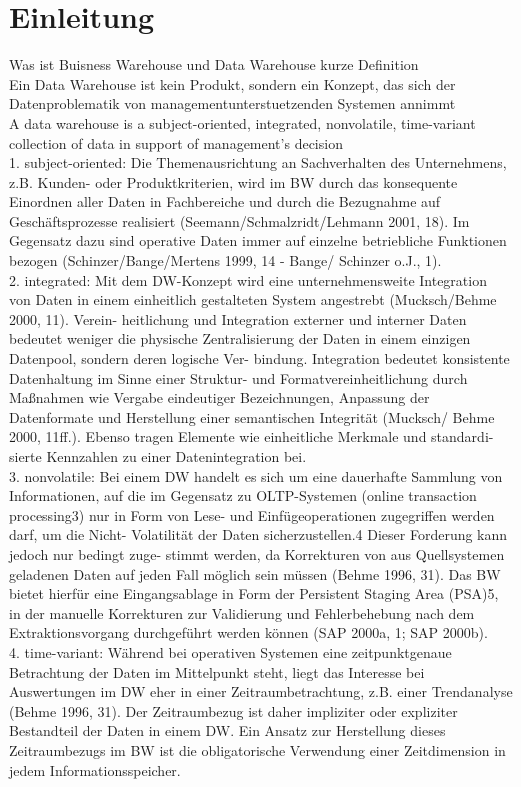 \chapter{Einleitung}
\label{Kapitel:Einleitung}

Was ist Buisness Warehouse und Data Warehouse kurze Definition \\
Ein Data Warehouse ist kein Produkt, sondern ein Konzept, das sich der Datenproblematik von managementunterstuetzenden Systemen annimmt\\
A data warehouse is a subject-oriented, integrated, nonvolatile, time-variant collection of data in support of management’s decision \\

1. subject-oriented: Die Themenausrichtung an Sachverhalten des Unternehmens, z.B. Kunden- oder Produktkriterien, wird im BW durch das konsequente Einordnen aller Daten in Fachbereiche und durch die Bezugnahme auf Geschäftsprozesse realisiert (Seemann/Schmalzridt/Lehmann 2001, 18). Im Gegensatz dazu sind operative Daten immer auf einzelne betriebliche Funktionen bezogen (Schinzer/Bange/Mertens 1999, 14 - Bange/ Schinzer o.J., 1). \\
2. integrated: Mit dem DW-Konzept wird eine unternehmensweite Integration von Daten in einem einheitlich gestalteten System angestrebt (Mucksch/Behme 2000, 11). Verein- heitlichung und Integration externer und interner Daten bedeutet weniger die physische Zentralisierung der Daten in einem einzigen Datenpool, sondern deren logische Ver- bindung. Integration bedeutet konsistente Datenhaltung im Sinne einer Struktur- und Formatvereinheitlichung durch Maßnahmen wie Vergabe eindeutiger Bezeichnungen, Anpassung der Datenformate und Herstellung einer semantischen Integrität (Mucksch/ Behme 2000, 11ff.). Ebenso tragen Elemente wie einheitliche Merkmale und standardi- sierte Kennzahlen zu einer Datenintegration bei.\\
3. nonvolatile: Bei einem DW handelt es sich um eine dauerhafte Sammlung von Informationen, auf die im Gegensatz zu OLTP-Systemen (online transaction processing3) nur in Form von Lese- und Einfügeoperationen zugegriffen werden darf, um die Nicht- Volatilität der Daten sicherzustellen.4 Dieser Forderung kann jedoch nur bedingt zuge- stimmt werden, da Korrekturen von aus Quellsystemen geladenen Daten auf jeden Fall möglich sein müssen (Behme 1996, 31). Das BW bietet hierfür eine Eingangsablage in Form der Persistent Staging Area (PSA)5, in der manuelle Korrekturen zur Validierung und Fehlerbehebung nach dem Extraktionsvorgang durchgeführt werden können (SAP 2000a, 1; SAP 2000b).\\
4. time-variant: Während bei operativen Systemen eine zeitpunktgenaue Betrachtung der Daten im Mittelpunkt steht, liegt das Interesse bei Auswertungen im DW eher in einer Zeitraumbetrachtung, z.B. einer Trendanalyse (Behme 1996, 31). Der Zeitraumbezug ist daher impliziter oder expliziter Bestandteil der Daten in einem DW. Ein Ansatz zur Herstellung dieses Zeitraumbezugs im BW ist die obligatorische Verwendung einer Zeitdimension in jedem Informationsspeicher.


